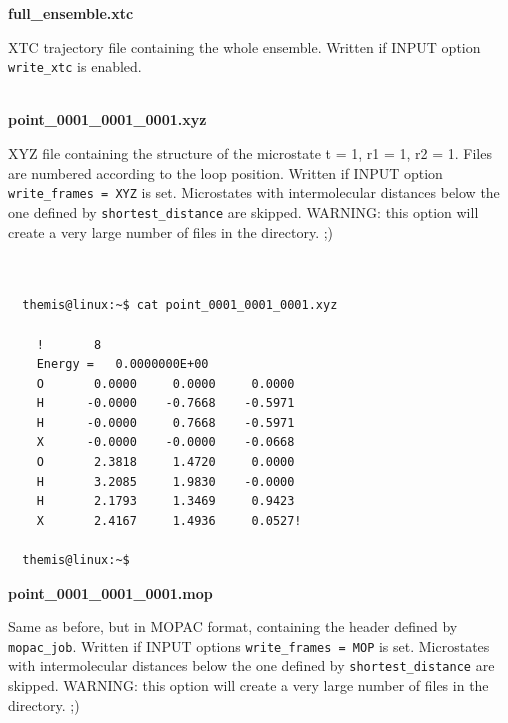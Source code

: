 \documentclass[10pt,a4paper]{report}
\begin{document}
\textbf{full\_ensemble.xtc}

  XTC trajectory file containing the whole ensemble. Written if INPUT option
  \texttt{write\_xtc} is enabled. \\~

\textbf{point\_0001\_0001\_0001.xyz}

  XYZ file containing the structure of the microstate t = 1, r1 = 1, r2 = 1. Files
are numbered according to the loop position. Written if INPUT option
\texttt{write\_frames = XYZ} is set. Microstates with intermolecular distances 
below the one defined by \texttt{shortest\_distance} are skipped. WARNING: this 
option will create a very large number of files in the directory. ;) \\~ 

\begin{center}
  \begin{minipage}{0.40\textwidth}
    \begin{verbatim}

  themis@linux:~$ cat point_0001_0001_0001.xyz

    !       8
    Energy =   0.0000000E+00
    O       0.0000     0.0000     0.0000
    H      -0.0000    -0.7668    -0.5971
    H      -0.0000     0.7668    -0.5971
    X      -0.0000    -0.0000    -0.0668
    O       2.3818     1.4720     0.0000
    H       3.2085     1.9830    -0.0000
    H       2.1793     1.3469     0.9423
    X       2.4167     1.4936     0.0527!

  themis@linux:~$ 

    \end{verbatim}
    \vskip0.25cm
  \end{minipage}%
\end{center}

\textbf{point\_0001\_0001\_0001.mop}
  
  Same as before, but in MOPAC format, containing the header defined by 
\texttt{mopac\_job}. Written if INPUT options \texttt{write\_frames = MOP} is 
set. Microstates with intermolecular distances below the one defined by 
\texttt{shortest\_distance} are skipped. WARNING: this option will create a 
very large number of files in the directory. ;) \\~ 
\end{document}
